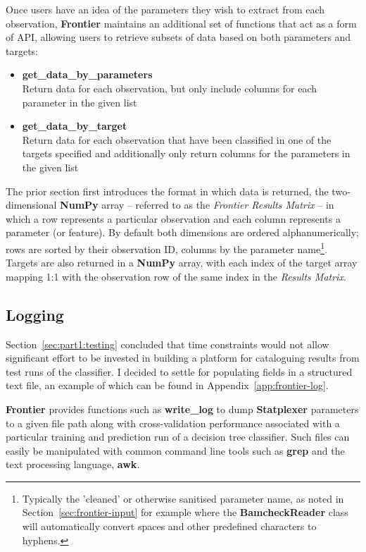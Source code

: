 Once users have an idea of the parameters they wish to extract from each
observation, \textbf{Frontier} maintains an additional set of functions that act
as a form of API, allowing users to retrieve subsets of data based on both
parameters and targets:

\begin{itemize}
    \item \textbf{get\_data\_by\_parameters} \hfill\\
        Return data for each observation, but only include columns
        for each parameter in the given list
    \item \textbf{get\_data\_by\_target} \hfill\\
        Return data for each observation that have been classified in one of the
        targets specified and additionally only return columns for the
        parameters in the given list
\end{itemize}

The prior section first introduces the format in which data is returned, the
two-dimensional \textbf{NumPy} array -- referred to as the \textit{Frontier Results
Matrix} -- in which a row represents a particular observation and each column
represents a parameter (or feature). By default both dimensions are
ordered alphanumerically; rows are sorted by their observation ID, columns by
the parameter name\footnote{Typically the 'cleaned' or otherwise sanitised
    parameter name, as noted in Section~\ref{sec:frontier-input} for example
where the \textbf{BamcheckReader} class will automatically convert spaces and
other predefined characters to hyphens.}. Targets are also returned in a
\textbf{NumPy} array, with each index of the target array mapping 1:1 with the
observation row of the same index in the \textit{Results Matrix}.


\subsection{Logging}

Section~\ref{sec:part1:testing} concluded that time constraints would not allow
significant effort to be invested in building a platform for cataloguing results
from test runs of the classifier. I decided to settle for populating fields in a
structured text file, an example of which can be found in
Appendix~\ref{app:frontier-log}.

\textbf{Frontier} provides functions such as \textbf{write\_log} to dump
\textbf{Statplexer} parameters to a given file path along with cross-validation
performance associated with a particular training and prediction run of a
decision tree classifier. Such files can easily be manipulated with common
command line tools such as \textbf{grep} and the text processing language,
\textbf{awk}.

